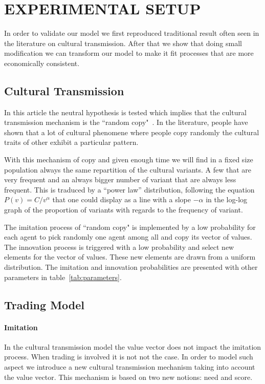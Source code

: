 \documentclass{wscpaperproc}
\begin{document}
\section{EXPERIMENTAL SETUP}


In order to validate our model we first reproduced traditional  result often seen in the literature on cultural transmission. After that we show that doing small modification we can transform our model to make it fit processes that are more economically consistent.

\subsection{Cultural Transmission}

In this article the neutral hypothesis is tested which implies that the cultural transmission mechanism is the ``random copy"~\cite{bentley_random_2004,bentley_specialisation_2005,mesoudi_random_2009}. In the literature, people have shown that a lot of cultural phenomene where people copy randomly the cultural traits of other exhibit a particular pattern.

With this mechanism of copy and given enough time  we will find in a fixed size population always the same repartition of the cultural variants. A few that are very frequent and an always bigger number of variant that are always less frequent. This is traduced by a ``power law'' distribution, following the equation $P(v)=C/v^\alpha $ that one could display as a line with a slope $-\alpha$ in the log-log graph of the proportion of variants with regards to the frequency of variant.

The imitation process of ``random copy" is implemented by a low probability for each agent to pick randomly one agent among all and copy its vector of values. The innovation process is triggered with a low probability and select new elements for the vector of values. These new elements are drawn from a uniform distribution. The imitation and innovation probabilities are presented with other parameters in table~\ref{tab:parameters}.

\subsection{Trading Model}\label{sec:trade}

\paragraph{Imitation}
In the cultural transmission model the value vector does not impact the imitation process. When trading is involved it is not not the case. In order to model such aspect we introduce a new cultural transmission mechanism taking into account the value vector. This mechanism is based on two new notions: need and score. 
\end{document}
